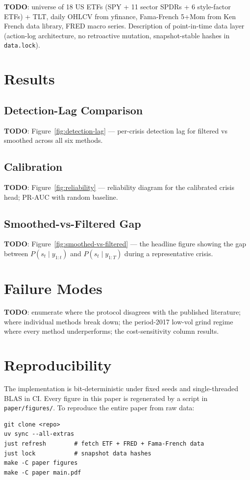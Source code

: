 \documentclass[11pt]{article}
\begin{document}
\textbf{TODO}: universe of 18 US ETFs (SPY + 11 sector SPDRs + 6 style-factor
ETFs) + TLT, daily OHLCV from yfinance, Fama-French 5+Mom from Ken French
data library, FRED macro series. Description of point-in-time data layer
(action-log architecture, no retroactive mutation, snapshot-stable hashes
in \texttt{data.lock}).

\section{Results}
\label{sec:results}

\subsection{Detection-Lag Comparison}
\textbf{TODO}: Figure~\ref{fig:detection-lag} — per-crisis detection lag for
filtered vs smoothed across all six methods.

\subsection{Calibration}
\textbf{TODO}: Figure~\ref{fig:reliability} — reliability diagram for the
calibrated crisis head; PR-AUC with random baseline.

\subsection{Smoothed-vs-Filtered Gap}
\textbf{TODO}: Figure~\ref{fig:smoothed-vs-filtered} — the headline figure
showing the gap between $P(s_t \mid y_{1:t})$ and $P(s_t \mid y_{1:T})$
during a representative crisis.

\section{Failure Modes}
\label{sec:failure}

\textbf{TODO}: enumerate where the protocol disagrees with the published
literature; where individual methods break down; the period-2017 low-vol
grind regime where every method underperforms; the cost-sensitivity column
results.

\section{Reproducibility}
\label{sec:repro}

The implementation is bit-deterministic under fixed seeds and single-threaded
BLAS in CI. Every figure in this paper is regenerated by a script in
\texttt{paper/figures/}. To reproduce the entire paper from raw data:
\begin{verbatim}
git clone <repo>
uv sync --all-extras
just refresh        # fetch ETF + FRED + Fama-French data
just lock           # snapshot data hashes
make -C paper figures
make -C paper main.pdf
\end{verbatim}
\end{document}
